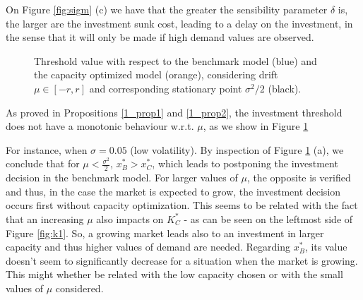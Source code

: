 On Figure \ref{fig:sigm} (c) we have that the greater the sensibility parameter $\delta$ is, the larger are the investment sunk cost, leading to a delay on the investment, in the sense that it will only be made if high demand values are observed.

\begin{figure}[!htb]
	\begin{subfigmatrix}{2}
	\end{subfigmatrix}
	\caption{Threshold value with respect to the benchmark model (blue) and the capacity optimized model (orange), considering drift $\mu \in [-r, r]$ and corresponding stationary point $\sigma^2/2$ (black).}
	\label{fig:mu}
\end{figure}

As proved in Propositions \ref{1_prop1} and \ref{1_prop2}, the investment threshold does not have a monotonic behaviour w.r.t. $\mu$, as we show in Figure \ref{fig:mu}

For instance, when $\sigma=0.05$ (low volatility). By inspection of Figure  \ref{fig:mu} (a), we conclude that for $\mu<\frac{\sigma^2}{2}$, $x^*_B>x^*_C$, which leads to postponing the investment decision in the benchmark model. For larger values of $\mu$, the opposite is verified and thus, in the case the market is expected to grow, the investment decision occurs first without capacity optimization. This seems to be related with the fact that an increasing $\mu$ also impacts on $K_C^*$ - as can be seen on the leftmost side of Figure \ref{fig:k1}. So, a growing market leads also to an investment in larger capacity and thus higher values of demand are needed. Regarding $x^*_B$, its value doesn't seem to significantly decrease for a situation when the market is growing. This might whether be related with the low capacity chosen or with the small values of $\mu$ considered.

